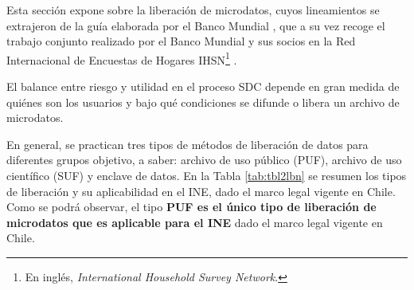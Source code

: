 \documentclass[]{book}
\theoremstyle{definition}
\theoremstyle{definition}
\theoremstyle{definition}
\theoremstyle{definition}
\theoremstyle{remark}
\begin{document}
Esta sección expone sobre la liberación de microdatos, cuyos lineamientos se extrajeron de la guía elaborada por el Banco Mundial \citep{benschop2021}, que a su vez recoge el trabajo conjunto realizado por el Banco Mundial y sus socios en la Red Internacional de Encuestas de Hogares IHSN\footnote{En inglés, \emph{International Household Survey Network}.} \citep{dupriez2010}.

El balance entre riesgo y utilidad en el proceso SDC depende en gran medida de quiénes son los usuarios y bajo qué condiciones se difunde o libera un archivo de microdatos.

En general, se practican tres tipos de métodos de liberación de datos para diferentes grupos objetivo, a saber: archivo de uso público (PUF), archivo de uso científico (SUF) y enclave de datos. En la Tabla \ref{tab:tbl2lbn} se resumen los tipos de liberación y su aplicabilidad en el INE, dado el marco legal vigente en Chile. Como se podrá observar, el tipo \textbf{PUF es el único tipo de liberación de microdatos que es aplicable para el INE} dado el marco legal vigente en Chile.
\end{document}
